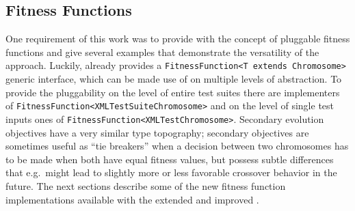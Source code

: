 \subsection{Fitness Functions}
\label{sec:fit}
One requirement of this work was to provide \xmlmate with the concept of pluggable fitness functions and 
give several examples that demonstrate the versatility of the approach. Luckily, \evosuite already provides 
a \texttt{FitnessFunction<T extends Chromosome>} generic interface, which can be made use of on multiple 
levels of abstraction. To provide the pluggability on the level of  entire test suites there are implementers of
\texttt{FitnessFunction<XMLTestSuiteChromosome>} and on the level of single test inputs ones of 
\texttt{FitnessFunction<XMLTestChromosome>}. 
Secondary evolution objectives have a very similar type topography; secondary objectives are sometimes useful 
as ``tie breakers'' when a decision between two chromosomes has to be made when both have equal fitness values,
but possess subtle differences that e.g.\ might lead to slightly more or less favorable crossover behavior in 
the future. The next sections describe some of the new fitness function implementations available with the 
extended and improved \xmlmate.
